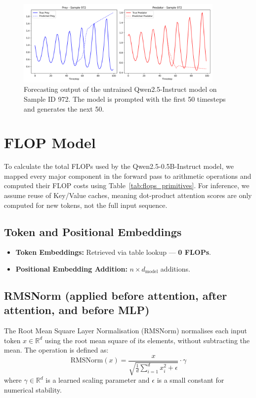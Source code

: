 \documentclass[a4paper,12pt]{article}
\begin{document}
  \begin{figure}[h]
      \centering
      \includegraphics[width=0.9\textwidth]{sample972_untrained.png}
      \caption{Forecasting output of the untrained Qwen2.5-Instruct model on Sample ID 972. The model is prompted with the first 50 timesteps and generates the next 50.}
      \label{fig:sample972_untrained}
  \end{figure}
  

  \section{FLOP Model}

To calculate the total FLOPs used by the Qwen2.5-0.5B-Instruct model, we mapped every major component in the forward pass to arithmetic operations and computed their FLOP costs using Table~\ref{tab:flops_primitives}. For inference, we assume reuse of Key/Value caches, meaning dot-product attention scores are only computed for new tokens, not the full input sequence.

\subsection*{Token and Positional Embeddings}
\begin{itemize}
  \item \textbf{Token Embeddings:} Retrieved via table lookup — \textbf{0 FLOPs}.
  \item \textbf{Positional Embedding Addition:} $n \times d_{\text{model}}$ additions.
\end{itemize}

\subsection*{RMSNorm (applied before attention, after attention, and before MLP)}

The Root Mean Square Layer Normalisation (RMSNorm) \citep{zhang2019root} normalises each input token $x \in \mathbb{R}^d$ using the root mean square of its elements, without subtracting the mean. The operation is defined as:
\begin{equation}
\text{RMSNorm}(x) = \frac{x}{\sqrt{\frac{1}{d} \sum_{i=1}^{d} x_i^2 + \epsilon}} \cdot \gamma
\end{equation}
where $\gamma \in \mathbb{R}^d$ is a learned scaling parameter and $\epsilon$ is a small constant for numerical stability.
\end{document}
